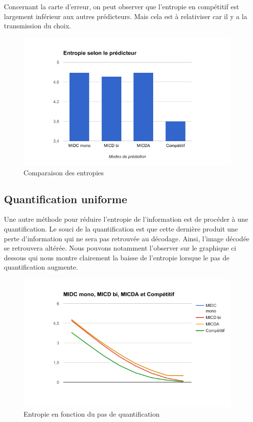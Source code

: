 \documentclass[12pt]{report}
\begin{document}
Concernant la carte d'erreur, on peut observer que l'entropie  en compétitif est largement inférieur aux autres prédicteurs. Mais cela est à relativiser car il y a la transmission du choix.

\begin{figure}[H]
\begin{center}
\includegraphics[scale=0.8]{../ImageRes/entropie.png} 
\caption{Comparaison des entropies}
\end{center}
\end{figure}

\subsection{Quantification uniforme}

Une autre méthode pour réduire l'entropie de l'information est de procéder à une quantification. Le souci de la quantification est que cette dernière produit une perte d'information qui ne sera pas retrouvée au décodage. Ainsi, l'image décodée se retrouvera altérée. Nous pouvons notamment l'observer sur le graphique ci dessous qui nous montre clairement la baisse de l'entropie lorsque le pas de quantification augmente.

\begin{figure}[H]
\begin{center}
\includegraphics[scale=0.8]{../ImageRes/entropieQ.png} 
\caption{Entropie en fonction du pas de quantification}
\end{center}
\end{figure}
\end{document}
